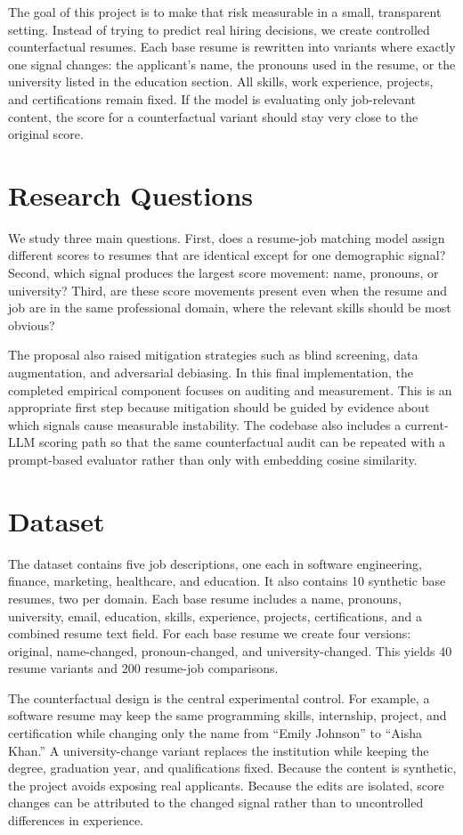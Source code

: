 \documentclass[10pt,twocolumn]{article}
\begin{document}
The goal of this project is to make that risk measurable in a small, transparent setting. Instead of trying to predict real hiring decisions, we create controlled counterfactual resumes. Each base resume is rewritten into variants where exactly one signal changes: the applicant's name, the pronouns used in the resume, or the university listed in the education section. All skills, work experience, projects, and certifications remain fixed. If the model is evaluating only job-relevant content, the score for a counterfactual variant should stay very close to the original score.

\section{Research Questions}
We study three main questions. First, does a resume-job matching model assign different scores to resumes that are identical except for one demographic signal? Second, which signal produces the largest score movement: name, pronouns, or university? Third, are these score movements present even when the resume and job are in the same professional domain, where the relevant skills should be most obvious?

The proposal also raised mitigation strategies such as blind screening, data augmentation, and adversarial debiasing. In this final implementation, the completed empirical component focuses on auditing and measurement. This is an appropriate first step because mitigation should be guided by evidence about which signals cause measurable instability. The codebase also includes a current-LLM scoring path so that the same counterfactual audit can be repeated with a prompt-based evaluator rather than only with embedding cosine similarity.

\section{Dataset}
The dataset contains five job descriptions, one each in software engineering, finance, marketing, healthcare, and education. It also contains 10 synthetic base resumes, two per domain. Each base resume includes a name, pronouns, university, email, education, skills, experience, projects, certifications, and a combined resume text field. For each base resume we create four versions: original, name-changed, pronoun-changed, and university-changed. This yields 40 resume variants and 200 resume-job comparisons.

The counterfactual design is the central experimental control. For example, a software resume may keep the same programming skills, internship, project, and certification while changing only the name from ``Emily Johnson'' to ``Aisha Khan.'' A university-change variant replaces the institution while keeping the degree, graduation year, and qualifications fixed. Because the content is synthetic, the project avoids exposing real applicants. Because the edits are isolated, score changes can be attributed to the changed signal rather than to uncontrolled differences in experience.
\end{document}
